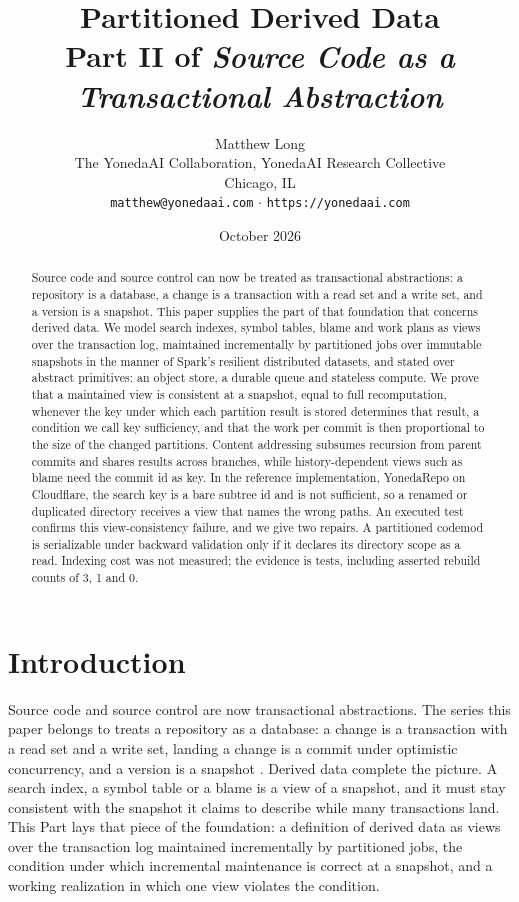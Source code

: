 \documentclass[11pt,letterpaper]{article}
\title{Partitioned Derived Data\\[4pt]
  {\normalsize Part II of \emph{Source Code as a Transactional Abstraction}}}
\author{Matthew Long\\
  \small The YonedaAI Collaboration, YonedaAI Research Collective\\
  \small Chicago, IL\\
  \small \texttt{matthew@yonedaai.com} $\cdot$ \texttt{https://yonedaai.com}}
\date{October 2026}
\theoremstyle{definition}
\theoremstyle{remark}
\begin{document}
\maketitle

\begin{abstract}
Source code and source control can now be treated as transactional abstractions: a repository is a database, a change is a transaction with a read set and a write set, and a version is a snapshot. This paper supplies the part of that foundation that concerns derived data. We model search indexes, symbol tables, blame and work plans as views over the transaction log, maintained incrementally by partitioned jobs over immutable snapshots in the manner of Spark's resilient distributed datasets, and stated over abstract primitives: an object store, a durable queue and stateless compute. We prove that a maintained view is consistent at a snapshot, equal to full recomputation, whenever the key under which each partition result is stored determines that result, a condition we call key sufficiency, and that the work per commit is then proportional to the size of the changed partitions. Content addressing subsumes recursion from parent commits and shares results across branches, while history-dependent views such as blame need the commit id as key. In the reference implementation, YonedaRepo on Cloudflare, the search key is a bare subtree id and is not sufficient, so a renamed or duplicated directory receives a view that names the wrong paths. An executed test confirms this view-consistency failure, and we give two repairs. A partitioned codemod is serializable under backward validation only if it declares its directory scope as a read. Indexing cost was not measured; the evidence is tests, including asserted rebuild counts of 3, 1 and 0.
\end{abstract}

\section{Introduction}
\label{sec:pdd:intro}

Source code and source control are now transactional abstractions. The series this paper belongs to treats a repository as a database: a change is a transaction with a read set and a write set, landing a change is a commit under optimistic concurrency, and a version is a snapshot \cite{long2026partI}. Derived data complete the picture. A search index, a symbol table or a blame is a view of a snapshot, and it must stay consistent with the snapshot it claims to describe while many transactions land. This Part lays that piece of the foundation: a definition of derived data as views over the transaction log maintained incrementally by partitioned jobs, the condition under which incremental maintenance is correct at a snapshot, and a working realization in which one view violates the condition.
\end{document}
